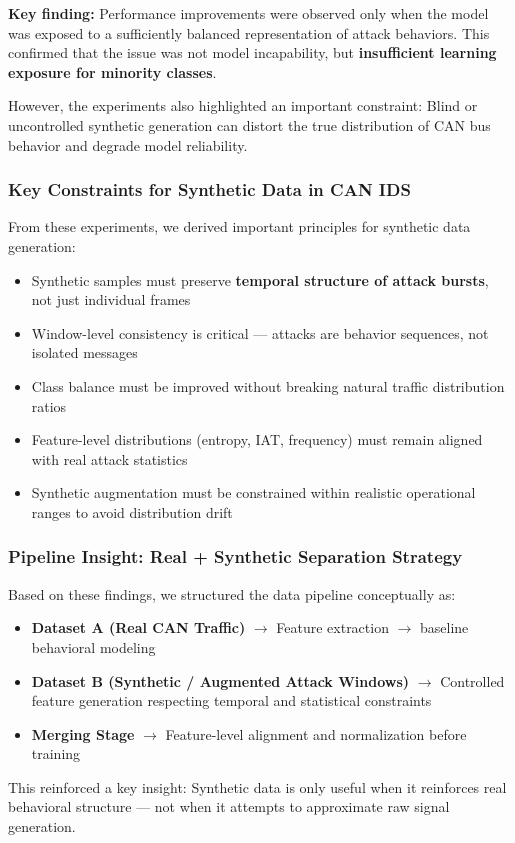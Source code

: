\documentclass{article}
\begin{document}
\textbf{Key finding:}
Performance improvements were observed only when the model was exposed to a sufficiently balanced representation of attack behaviors. This confirmed that the issue was not model incapability, but \textbf{insufficient learning exposure for minority classes}.

However, the experiments also highlighted an important constraint:
Blind or uncontrolled synthetic generation can distort the true distribution of CAN bus behavior and degrade model reliability.

\subsubsection{Key Constraints for Synthetic Data in CAN IDS}
From these experiments, we derived important principles for synthetic data generation:
\begin{itemize}[noitemsep]
    \item Synthetic samples must preserve \textbf{temporal structure of attack bursts}, not just individual frames
    \item Window-level consistency is critical — attacks are behavior sequences, not isolated messages
    \item Class balance must be improved without breaking natural traffic distribution ratios
    \item Feature-level distributions (entropy, IAT, frequency) must remain aligned with real attack statistics
    \item Synthetic augmentation must be constrained within realistic operational ranges to avoid distribution drift
\end{itemize}

\subsubsection{Pipeline Insight: Real + Synthetic Separation Strategy}
Based on these findings, we structured the data pipeline conceptually as:
\begin{itemize}[noitemsep]
    \item \textbf{Dataset A (Real CAN Traffic)} $\rightarrow$ Feature extraction $\rightarrow$ baseline behavioral modeling
    \item \textbf{Dataset B (Synthetic / Augmented Attack Windows)} $\rightarrow$ Controlled feature generation respecting temporal and statistical constraints
    \item \textbf{Merging Stage} $\rightarrow$ Feature-level alignment and normalization before training
\end{itemize}
This reinforced a key insight:
Synthetic data is only useful when it reinforces real behavioral structure — not when it attempts to approximate raw signal generation.
\end{document}
